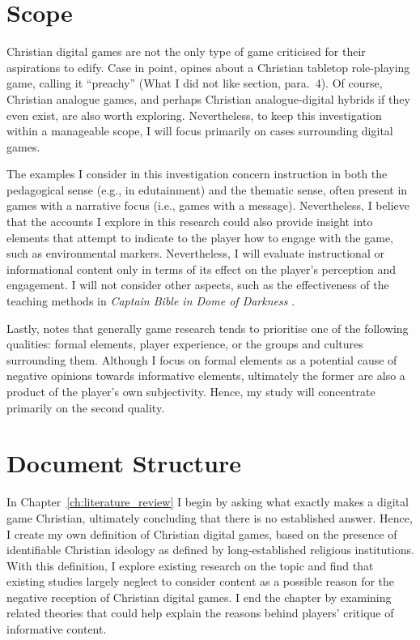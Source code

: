 \section{Scope}

Christian digital games are not the only type of game criticised for their aspirations to edify. Case in point, \textcite{johnson_dragonraid_2018} opines about a Christian tabletop role-playing game, calling it ``preachy'' (What I did not like section, para.~4). Of course, Christian analogue games, and perhaps Christian analogue-digital hybrids if they even exist, are also worth exploring. Nevertheless, to keep this investigation within a manageable scope, I will focus primarily on cases surrounding digital games.

The examples I consider in this investigation concern instruction in both the pedagogical sense (e.g., in edutainment) and the thematic sense, often present in games with a narrative focus (i.e., games with a message). Nevertheless, I believe that the accounts I explore in this research could also provide insight into elements that attempt to indicate to the player how to engage with the game, such as environmental markers. Nevertheless, I will evaluate instructional or informational content only in terms of its effect on the player's perception and engagement. I will not consider other aspects, such as the effectiveness of the teaching methods in \textit{Captain Bible in Dome of Darkness} \parencite{engelbrite_captain_1994}.

Lastly, \parencite[7]{calleja_in_game_2011} notes that generally game research tends to prioritise one of the following qualities: formal elements, player experience, or the groups and cultures surrounding them. Although I focus on formal elements as a potential cause of negative opinions towards informative elements, ultimately the former are also a product of the player's own subjectivity. Hence, my study will concentrate primarily on the second quality.

\section{Document Structure}

In Chapter~\ref{ch:literature_review} I begin by asking what exactly makes a digital game Christian, ultimately concluding that there is no established answer. Hence, I create my own definition of Christian digital games, based on the presence of identifiable Christian ideology as defined by long-established religious institutions. With this definition, I explore existing research on the topic and find that existing studies largely neglect to consider content as a possible reason for the negative reception of Christian digital games. I end the chapter by examining related theories that could help explain the reasons behind players' critique of informative content.

